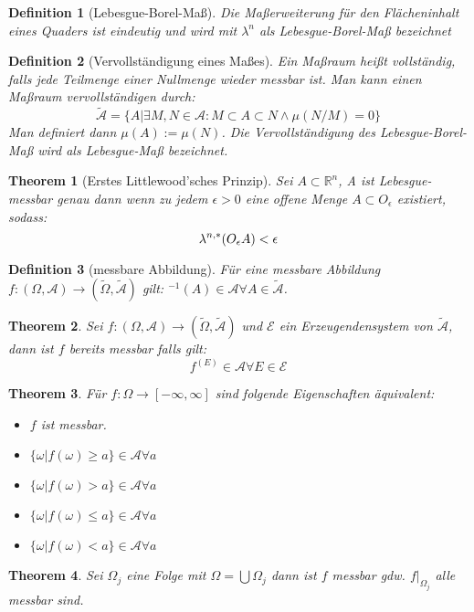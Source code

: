 \documentclass[10pt,a4paper]{article}
\newtheorem{theorem}{Theorem}
\newtheorem{definition}{Definition}
\begin{document}
\begin{definition}[Lebesgue-Borel-Maß]
	Die Maßerweiterung für den Flächeninhalt eines Quaders ist eindeutig und wird mit $\lambda^n$ als Lebesgue-Borel-Maß bezeichnet
\end{definition}
\begin{definition}[Vervollständigung eines Maßes]
	Ein Maßraum heißt vollständig, falls jede Teilmenge einer Nullmenge wieder messbar ist. Man kann einen Maßraum vervollständigen durch:
	$$\tilde{\mathcal{A}} = \{A| \exists M, N \in \mathcal{A}: M\subset A \subset N \land \mu(N/M) = 0\}$$
	Man definiert dann $\mu(A) := \mu(N)$. Die Vervollständigung des Lebesgue-Borel-Maß wird als Lebesgue-Maß bezeichnet.
\end{definition}
\begin{theorem}[Erstes Littlewood'sches Prinzip]
	Sei $A \subset \mathbb{R}^n$, A ist Lebesgue-messbar genau dann wenn zu jedem $\epsilon > 0$ eine offene Menge $A \subset O_\epsilon$ existiert, sodass:
	$$\lambda^{n, *} (O_\epsilon\\A) < \epsilon$$
\end{theorem}
\begin{definition}[messbare Abbildung]
	Für eine messbare Abbildung $f: (\Omega, \mathcal{A}) \to (\tilde{\Omega}, \tilde{\mathcal{A}})$ gilt: $^{-1}(A) \in \mathcal{A} \forall A \in \tilde{\mathcal{A}}$.
\end{definition}
\begin{theorem}
	Sei $f: (\Omega, \mathcal{A}) \to (\tilde{\Omega}, \tilde{\mathcal{A}})$ und $\mathcal{E}$ ein Erzeugendensystem von $\tilde{\mathcal{A}}$, dann ist $f$ bereits messbar falls gilt:
	$$f^(E) \in \mathcal{A} \forall E \in \mathcal{E}$$
\end{theorem}
\begin{theorem}
	Für $f: \Omega \to [-\infty, \infty]$ sind folgende Eigenschaften äquivalent:
	\begin{itemize}
		\item $f$ ist messbar.
		\item $\{\omega | f(\omega) \geq a\}\in\mathcal{A}\forall a$
		\item $\{\omega | f(\omega) > a\}\in\mathcal{A}\forall a$
		\item $\{\omega | f(\omega) \leq a\}\in\mathcal{A}\forall a$
		\item $\{\omega | f(\omega) < a\}\in\mathcal{A}\forall a$
	\end{itemize}
\end{theorem}
\begin{theorem}
	Sei $\Omega_j$ eine Folge mit $\Omega = \bigcup\Omega_j$ dann ist $f$ messbar gdw. $f|_{\Omega_j}$ alle messbar sind.	
\end{theorem}
\end{document}

